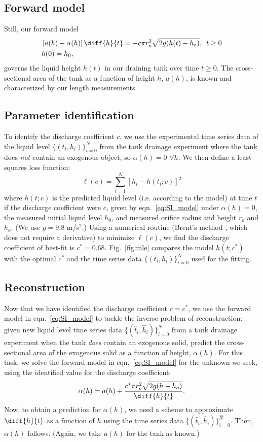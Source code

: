 \documentclass[a4paper,fleqn]{cas-sc}
\begin{document}
 \subsection{Forward model} Still, our forward model
\begin{align}
& \left[ a(h)-\alpha(h)\right] \diff{h}{t}= -c \pi r_o^2 \sqrt{2g (h(t)-h_o)}, \,\,\, t \geq 0\label{eq:SI_model} \\
& h(0)=h_0, \nonumber 
\end{align}
 governs the liquid height $h(t)$ in our draining tank over time $t \geq 0$.
 The cross-sectional area of the tank as a function of height $h$, $a(h)$, is known and characterized by our length measurements.
 
 \subsection{Parameter identification}
 To identify the discharge coefficient $c$, we use the experimental time series data of the liquid level $\{(t_i, h_i)\}_{i=0}^N$ from the tank drainage experiment where the tank does \emph{not} contain an exogenous object, so $\alpha(h) = 0$ $\forall h$. We then define a least-squares loss function:
 \begin{equation}
 	\ell(c) = \displaystyle\sum_{i=1}^N [h_i - h(t_i; c)]^2
 \end{equation} where $h(t;c)$ is the predicted liquid level (i.e. according to the model) at time $t$ if the discharge coefficient were $c$, given by eqn.~\ref{eq:SI_model} under $\alpha(h)=0$, the measured initial liquid level $h_0$, and measured orifice radius and height $r_o$ and $h_o$. (We use $g=9.8$ m/s$^2$.)
 Using a numerical routine (Brent's method \cite{brent2013algorithms}, which does not require a derivative) to minimize $\ell(c)$, we find the discharge coefficient of best-fit is $c^*=0.68$. Fig.~\ref{fig:mle} compares the model $h(t;c^*)$ with the optimal $c^*$ and the time series data $\{(t_i, h_i)\}_{i=0}^N$ used for the fitting.
 
 \subsection{Reconstruction}
Now that we have identified the discharge coefficient $c=c^*$, we use the forward model in eqn.~\ref{eq:SI_model} to tackle the inverse problem of reconstruction: given new liquid level time series data $\{(\hat{t}_i, \hat{h}_i)\}_{i=0}^{\hat{N}}$ from a tank drainage experiment when the tank \emph{does} contain an exogenous solid, predict the cross-sectional area of the exogenous solid as a function of height, $\alpha(h)$. For this task, we solve the forward model in eqn.~\ref{eq:SI_model} for the unknown we seek, using the identified value for the discharge coefficient:
\begin{equation}
\alpha(h) = a(h) +  \frac{c^* \pi r_o^2 \sqrt{2g (h-h_o)}}{\diff{h}{t}}. \label{eq:alpha_unknown}
\end{equation} 
Now, to obtain a prediction for $\alpha(h)$, we need a scheme to approximate $\diff{h}{t}$ as a function of $h$ using the time series data $\{(\hat{t}_i, \hat{h}_i)\}_{i=0}^{\hat{N}}$. Then, $\alpha(h)$ follows. (Again, we take $a(h)$ for the tank as known.)
\end{document}
